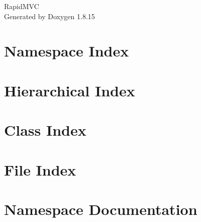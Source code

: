 \let\mypdfximage\pdfximage\def\pdfximage{\immediate\mypdfximage}\documentclass[twoside]{book}
\newcommand{\+}{\discretionary{\mbox{\scriptsize$\hookleftarrow$}}{}{}}
\newcommand{\clearemptydoublepage}{%
  \newpage{\pagestyle{empty}\cleardoublepage}%
}
\begin{document}
\hypersetup{pageanchor=false,
             bookmarksnumbered=true,
             pdfencoding=unicode
            }
\begin{titlepage}
\vspace*{7cm}
\begin{center}%
{\Large Rapid\+M\+VC }\\
\vspace*{1cm}
{\large Generated by Doxygen 1.8.15}\\
\end{center}
\end{titlepage}
\clearemptydoublepage
{}
\tableofcontents
\clearemptydoublepage
{}
\hypersetup{pageanchor=true}

\chapter{Namespace Index}

\chapter{Hierarchical Index}

\chapter{Class Index}

\chapter{File Index}

\chapter{Namespace Documentation}




\end{document}
